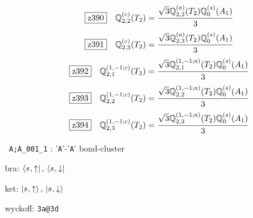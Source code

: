 \documentclass[fleqn,10pt,landscape]{jsarticle}
\begin{document}
\begin{dmath*}
\hspace*{3mm}\fbox{z390}\quad \mathbb{Q}_{2,2}^{(c)}(T_{2})=\frac{\sqrt{3} \mathbb{Q}_{2,2}^{(a)}(T_{2}) \mathbb{Q}_{0}^{(s)}(A_{1})}{3}
\end{dmath*}
\begin{dmath*}
\hspace*{3mm}\fbox{z391}\quad \mathbb{Q}_{2,3}^{(c)}(T_{2})=\frac{\sqrt{3} \mathbb{Q}_{2,3}^{(a)}(T_{2}) \mathbb{Q}_{0}^{(s)}(A_{1})}{3}
\end{dmath*}
\begin{dmath*}
\hspace*{3mm}\fbox{z392}\quad \mathbb{Q}_{2,1}^{(1,-1;c)}(T_{2})=\frac{\sqrt{3} \mathbb{Q}_{2,1}^{(1,-1;a)}(T_{2}) \mathbb{Q}_{0}^{(s)}(A_{1})}{3}
\end{dmath*}
\begin{dmath*}
\hspace*{3mm}\fbox{z393}\quad \mathbb{Q}_{2,2}^{(1,-1;c)}(T_{2})=\frac{\sqrt{3} \mathbb{Q}_{2,2}^{(1,-1;a)}(T_{2}) \mathbb{Q}_{0}^{(s)}(A_{1})}{3}
\end{dmath*}
\begin{dmath*}
\hspace*{3mm}\fbox{z394}\quad \mathbb{Q}_{2,3}^{(1,-1;c)}(T_{2})=\frac{\sqrt{3} \mathbb{Q}_{2,3}^{(1,-1;a)}(T_{2}) \mathbb{Q}_{0}^{(s)}(A_{1})}{3}
\end{dmath*}
\vspace{5mm}

\noindent\textbullet\, \texttt{A;A_001_1} : '\texttt{A}'-'\texttt{A}' bond-cluster

\noindent\quad * bra: $\bra{s_{},\uparrow},\, \bra{s_{},\downarrow}$

\noindent\quad * ket: $\ket{s_{},\uparrow},\, \ket{s_{},\downarrow}$

\noindent\quad * wyckoff: \texttt{3a@3d}
\end{document}
